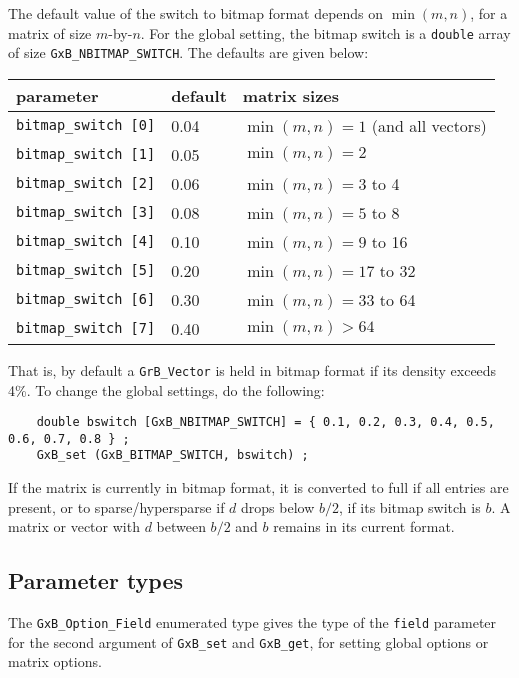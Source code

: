 \documentclass[12pt]{article}
\begin{document}
The default value of the switch to bitmap format depends on $\min(m,n)$, for a
matrix of size $m$-by-$n$.  For the global setting, the bitmap switch is a
\verb'double' array of size \verb'GxB_NBITMAP_SWITCH'.  The defaults are given
below:

\vspace{0.2in}
{\small
\begin{tabular}{lll}
parameter & default & matrix sizes \\
\hline
\verb'bitmap_switch [0]' & 0.04 & $\min(m,n) = 1$ (and all vectors) \\
\verb'bitmap_switch [1]' & 0.05 & $\min(m,n) = 2$ \\
\verb'bitmap_switch [2]' & 0.06 & $\min(m,n) = 3$ to 4 \\
\verb'bitmap_switch [3]' & 0.08 & $\min(m,n) = 5$ to 8 \\
\verb'bitmap_switch [4]' & 0.10 & $\min(m,n) = 9$ to 16\\
\verb'bitmap_switch [5]' & 0.20 & $\min(m,n) = 17$ to 32\\
\verb'bitmap_switch [6]' & 0.30 & $\min(m,n) = 33$ to 64 \\
\verb'bitmap_switch [7]' & 0.40 & $\min(m,n) > 64$ \\
\end{tabular}
}
\vspace{0.2in}

That is, by default a \verb'GrB_Vector' is held in bitmap format if its density
exceeds 4\%.  To change the global settings, do the following:

{\footnotesize
\begin{verbatim}
    double bswitch [GxB_NBITMAP_SWITCH] = { 0.1, 0.2, 0.3, 0.4, 0.5, 0.6, 0.7, 0.8 } ;
    GxB_set (GxB_BITMAP_SWITCH, bswitch) ;
\end{verbatim}
}

If the matrix is currently in bitmap format, it is converted to full if all
entries are present, or to sparse/hypersparse if $d$ drops below $b/2$, if its
bitmap switch is $b$.  A matrix or vector with $d$ between $b/2$ and $b$
remains in its current format.

\subsection{Parameter types}
The \verb'GxB_Option_Field' enumerated type gives the type of the \verb'field'
parameter for the second argument of \verb'GxB_set' and \verb'GxB_get',
for setting global options or matrix options.
\end{document}
